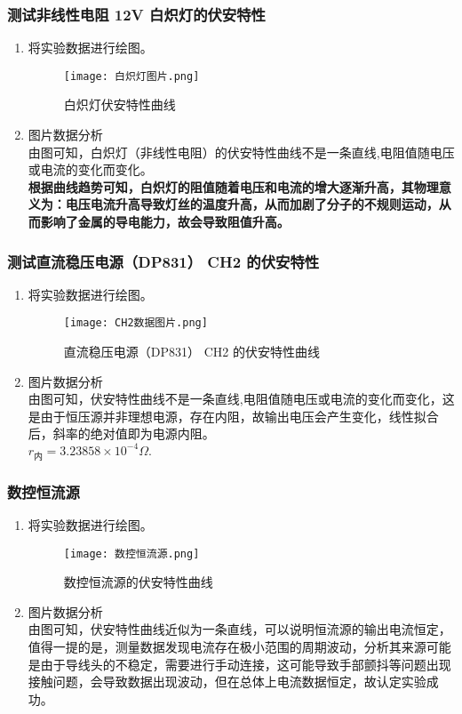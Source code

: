 \documentclass[dvipsnames, svgnames,a4paper,11pt]{article}
\begin{document}
	\subsubsection{测试非线性电阻 12V 白炽灯的伏安特性}
	\begin{enumerate}
		\item 将实验数据进行绘图。
			\begin{figure}[H]
			\centering
			\texttt{[image: 白炽灯图片.png]}
			\caption{白炽灯伏安特性曲线}
			\label{白炽灯伏安特性曲线}
		\end{figure}
		\item 图片数据分析\\
		由图可知，白炽灯（非线性电阻）的伏安特性曲线不是一条直线,电阻值随电压或电流的变化而变化。\\
		\textbf{根据曲线趋势可知，白炽灯的阻值随着电压和电流的增大逐渐升高，其物理意义为：电压电流升高导致灯丝的温度升高，从而加剧了分子的不规则运动，从而影响了金属的导电能力，故会导致阻值升高。}
		
	\end{enumerate}
	
	\subsubsection{测试直流稳压电源（DP831） CH2 的伏安特性}
	\begin{enumerate}
		\item 将实验数据进行绘图。
		\begin{figure}[H]
			\centering
			\texttt{[image: CH2数据图片.png]}
			\caption{直流稳压电源（DP831） CH2 的伏安特性曲线}
			\label{CH2数据图片}
		\end{figure}
		\item 图片数据分析\\
		由图可知，伏安特性曲线不是一条直线,电阻值随电压或电流的变化而变化，这是由于恒压源并非理想电源，存在内阻，故输出电压会产生变化，线性拟合后，斜率的绝对值即为电源内阻。\\
		$r_\text{内}=3.23858\times10^{-4}\Omega.$
		
	\end{enumerate}
		\subsubsection{数控恒流源}
	\begin{enumerate}
		\item 将实验数据进行绘图。
		\begin{figure}[H]
			\centering
			\texttt{[image: 数控恒流源.png]}
			\caption{数控恒流源的伏安特性曲线}
			\label{数控恒流源}
		\end{figure}
		\item 图片数据分析\\
		由图可知，伏安特性曲线近似为一条直线，可以说明恒流源的输出电流恒定，值得一提的是，测量数据发现电流存在极小范围的周期波动，分析其来源可能是由于导线头的不稳定，需要进行手动连接，这可能导致手部颤抖等问题出现接触问题，会导致数据出现波动，但在总体上电流数据恒定，故认定实验成功。
	
	\end{enumerate}
\end{document}
